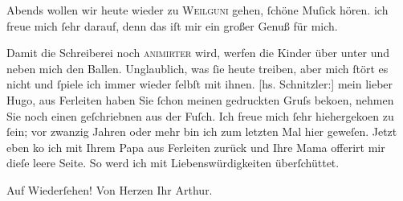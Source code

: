 \pstart
           Abends wollen wir heute wieder zu \textsc{Weilguni} gehen,{ }ſchöne Muſick hören. ich freue mich{ }ſehr darauf, denn das iſt mir ein
               großer Genuß für mich.\pend
           
\pstart
           Damit die Schreiberei noch \textsc{animirter} wird, werfen die
               Kinder über unter und neben mich den Ballen. Unglaublich, was{ }ſie heute treiben, aber
               mich{ }ſtört es nicht und{ }ſpiele ich immer wieder{ }ſelbſt mit ihnen.\pend
           \vspace{1em}{\vspace{1\baselineskip}}
\pstart
           {\pb}{[}hs. Schnitzler:{]} mein lieber Hugo, aus Ferleiten haben Sie{ }ſchon meinen gedruckten Gruſs beko{\geminationm}en, nehmen Sie noch einen geſchriebnen aus der Fuſch. Ich freue mich{ }ſehr hiehergeko{\geminationm}en zu{ }ſein; vor zwanzig Jahren oder mehr bin ich zum
               letzten Mal hier geweſen. Jetzt eben ko{\geminationm} ich mit Ihrem
                  Papa aus Ferleiten zurück und Ihre Mama offerirt mir dieſe leere
               Seite. So werd ich mit Liebenswürdigkeiten überſchüttet.\pend
           
\pstart
           Auf Wiederſehen!\pend
           \pstart Von Herzen Ihr \spacefill\mbox{Arthur.}\pend{}\endnumbering{}  \newcommand{\dateiname}{L00824}\newcommand{\titel}{Anna von Hofmannsthal und Arthur Schnitzler an Hugo von Hofmannsthal, [19. 7. 1898]}\newcommand{\editorInnen}{Martin Anton Müller und Gerd-Hermann Susen}
